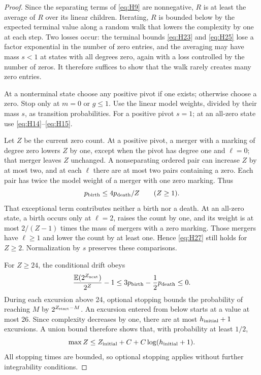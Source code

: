 \begin{proof}
Since the separating terms of \eqref{eq:H9} are nonnegative, \(R\) is at
least the average of \(R\) over its linear children. Iterating, \(R\) is
bounded below by the expected terminal value along a random walk that
lowers the complexity by one at each step. Two losses occur: the terminal
bounds \eqref{eq:H23} and \eqref{eq:H25} lose a factor exponential in the
number of zero entries, and the averaging may have mass \(s<1\) at states
with all degrees zero, again with a loss controlled by the number of zeros. It
therefore suffices to show that the walk rarely creates many zero entries.

At a nonterminal state choose any positive pivot if one exists;
otherwise choose a zero. Stop only at \(m=0\) or \(g\le1\). Use the
linear model weights, divided by their mass \(s\), as transition
probabilities. For a positive pivot \(s=1\); at an all-zero state use
\eqref{eq:H14}--\eqref{eq:H15}.

Let \(Z\) be the current zero count. At a positive pivot, a merger with a marking of degree zero
lowers \(Z\) by one, except when the pivot has degree one and \(\ell=0\);
that merger leaves \(Z\) unchanged. A nonseparating ordered pair can increase \(Z\) by
at most two, and at each \(\ell\) there are at most two pairs containing
a zero. Each pair has twice the model weight of a merger with one zero
marking. Thus \begin{equation}
p_{\rm birth}\le4p_{\rm death}/Z\qquad(Z\ge1).
\label{eq:H27}
\end{equation} That exceptional term contributes neither a
birth nor a death. At an all-zero state, a birth occurs only at
\(\ell=2\), raises the count by one, and its weight is at most
\(2/(Z-1)\) times the mass of mergers with a zero marking. Those mergers have
\(\ell\ge1\) and lower the count by at least one. Hence \eqref{eq:H27} still
holds for \(Z\ge2\). Normalization by \(s\) preserves these comparisons.

For \(Z\ge24\), the conditional drift obeys \[
\frac{\mathbb E(2^{Z_{\rm next}})}{2^Z}-1
\le3p_{\rm birth}-\frac12p_{\rm death}\le0.
\] During each excursion above 24, optional stopping bounds the
probability of reaching \(M\) by \(2^{Z_{\rm start}-M}\). An excursion
entered from below starts at a value at most 26. Since complexity decreases by
one, there are at most \(h_{\rm initial}+1\) excursions. A union bound
therefore shows that, with probability at least \(1/2\), \begin{equation}
\max Z\le Z_{\rm initial}+C+C\log(h_{\rm initial}+1).
\label{eq:H28}
\end{equation} All stopping times are bounded, so optional stopping
applies without further integrability conditions.


\end{proof}
